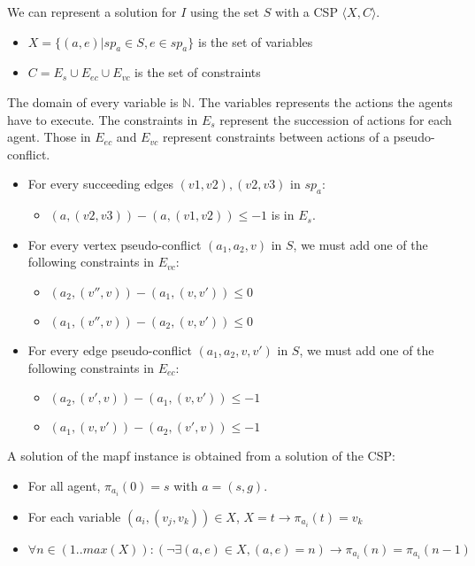 We can represent a solution for $I$ using the set $S$ with a CSP $\langle X,C \rangle.$
\begin{itemize}
  \item $X = \{(a,e) | sp_a \in S, e \in sp_a \}$ is the set of variables
  \item $C = E_s \cup E_{ec} \cup E_{vc}$ is the set of constraints
\end{itemize}
The domain of every variable is $ {\displaystyle \mathbb {N} }$.
The variables represents the actions the agents have to execute.
The constraints in $E_s$ represent the succession of actions for each agent. Those in $E_{ec}$ and $E_{vc}$ represent constraints between actions of a pseudo-conflict.

\begin{itemize}
  \item For every succeeding edges $(v1,v2),(v2,v3)$ in $sp_a$:
  \begin{itemize}
    \item $(a,(v2,v3)) - (a,(v1,v2)) \leq -1$ is in $E_s$.
  \end{itemize}
  \item For every vertex pseudo-conflict $(a_1,a_2,v)$ in $S$, we must add one of the following constraints in $E_{vc}$:
  \begin{itemize}
    \item $(a_2,(v'',v)) - (a_1,(v,v')) \leq 0$
    \item $(a_1,(v'',v)) - (a_2,(v,v')) \leq 0$
  \end{itemize}
  \item For every edge pseudo-conflict $(a_1,a_2,v,v')$ in $S$, we must add one of the following constraints in $E_{ec}$:
  \begin{itemize}
    \item $(a_2,(v',v)) - (a_1,(v,v')) \leq -1$
    \item $(a_1,(v,v')) - (a_2,(v',v)) \leq -1$
  \end{itemize}
\end{itemize}

A solution of the mapf instance is obtained from a solution of the CSP:
\begin{itemize}
  \item For all agent, $\pi_{a_i}(0)=s$ with $a=(s,g)$.
  \item For each variable $(a_i,(v_j,v_k)) \in X$, $X=t \rightarrow \pi_{a_i}(t)=v_k$
  \item $\forall n \in (1..max(X)): ( \neg\exists (a,e) \in X, (a,e)=n ) \rightarrow \pi_{a_i}(n)=\pi_{a_i}(n-1)$
\end{itemize}
